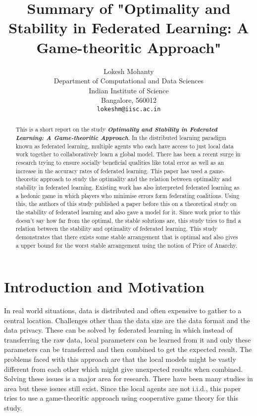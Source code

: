 \documentclass{article}
\title{Summary of "Optimality and Stability in Federated Learning: A Game-theoritic Approach"}
\author{
  Lokesh Mohanty\\
  Department of Computational and Data Sciences\\
  Indian Institute of Science\\
  Bangalore, 560012 \\
  \texttt{lokeshm@iisc.ac.in} \\
}
\begin{document}
\maketitle

\begin{abstract}
This is a short report on the study \textbf{\emph{Optimality and Stability in Federated Learning: A Game-theoritic Approach}}.
In the distributed learning paradigm known as federated learning, multiple agents who each have access to just local data work together to collaboratively learn a global model.
There has been a recent surge in research trying to ensure socially beneficial qualities like total error as well as an increase in the accuracy rates of federated learning.
This paper has used a game-theoretic approach to study the optimality and the relation between optimality and stability in federated learning. Existing work has also interpreted federated learning as a hedonic game in which players who minimise errors form federating coalitions. Using this, the authors of this study published a paper before this on a theoretical study on the stability of federated learning and also gave a model for it.
Since work prior to this doesn't say how far from the optimal, the stable solutions are, this study tries to find a relation between the stability and optimality of federated learning. This study demonstrates that there exists some stable arrangement that is optimal and also gives a upper bound for the worst stable arrangement using the notion of Price of Anarchy.
\end{abstract}

\section{Introduction and Motivation}
In real world situations, data is distributed and often expensive to gather to a central location. Challenges other than the data size are the data format and the data privacy. These can be solved by federated learning in which instead of transferring the raw data, local parameters can be learned from it and only these parameters can be transferred and then combined to get the expected result. The problems faced with this approach are that the local models might be vastly different from each other which might give unexpected results when combined. Solving these issues is a major area for research. There have been many studies in area but these issues still exist. Since the local agents are not i.i.d., this paper tries to use a game-theoritic approach using cooperative game theory for this study.
\end{document}
